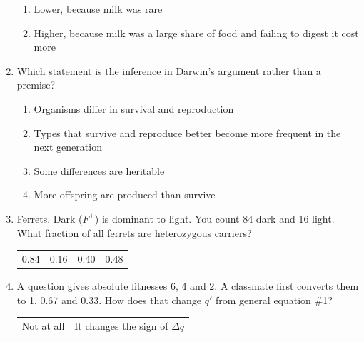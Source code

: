 \documentclass[11pt]{article}
\newcommand{\work}[1]{\par\vspace{#1}}
\begin{document}
\begin{enumerate}[label=\textbf{\arabic*.}, leftmargin=2em, itemsep=1.4em]
\begin{enumerate}[label={}, leftmargin=2.4em, labelwidth=0pt, itemsep=2pt, topsep=0pt]
\item \hspace*{-2.4em}Lower, because milk was rare
\item \hspace*{-2.4em}Higher, because milk was a large share of food and failing to digest it cost more
\end{enumerate}
\item Which statement is the inference in Darwin's argument rather than a premise?
\par\smallskip
\begin{enumerate}[label={}, leftmargin=2.4em, labelwidth=0pt, itemsep=2pt, topsep=0pt]
\item \hspace*{-2.4em}Organisms differ in survival and reproduction
\item \hspace*{-2.4em}Types that survive and reproduce better become more frequent in the next generation
\item \hspace*{-2.4em}Some differences are heritable
\item \hspace*{-2.4em}More offspring are produced than survive
\end{enumerate}
\item Ferrets. Dark (\(F^{+}\)) is dominant to light. You count 84 dark and 16 light. What fraction of all ferrets are heterozygous carriers?
\par\smallskip\noindent\begin{tabularx}{\linewidth}{@{}YYYY@{}}
0.84 & 0.16 & 0.40 & 0.48 \\
\end{tabularx}
\work{1.6cm}
\item A question gives absolute fitnesses 6, 4 and 2. A classmate first converts them to 1, 0.67 and 0.33. How does that change \(q'\) from general equation \#1?
\par\smallskip\noindent\begin{tabularx}{\linewidth}{@{}YY@{}}
Not at all & It changes the sign of \(\Delta q\) \\[3pt]

\end{tabularx}
\end{enumerate}
\end{document}
